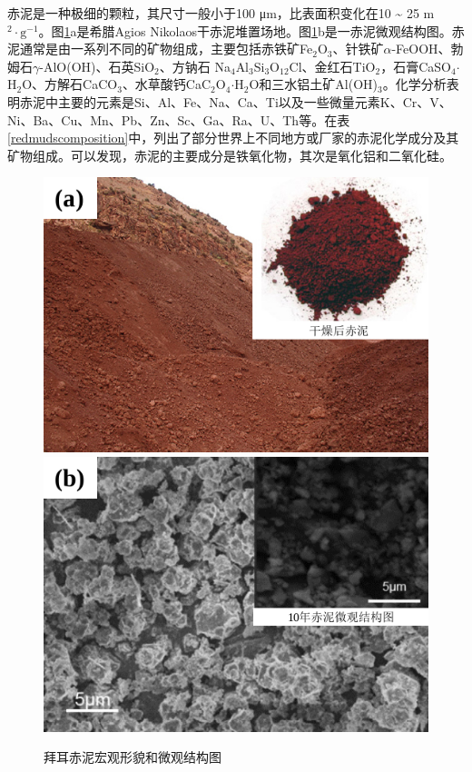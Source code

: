 赤泥是一种极细的颗粒，其尺寸一般小于100 μm，比表面积变化在10 \textasciitilde{ }25 m$ \mathrm{^{\mathrm{2}} \cdot g^{\mathrm{-1}}} $\cite{wang2008novel}。图\ref{redmudmicro}a是希腊Agios Nikolaos干赤泥堆置场地\cite{eurare2014}。图\ref{redmudmicro}b是一赤泥微观结构图\cite{zhong2009extraction,liu2007characterization}。赤泥通常是由一系列不同的矿物组成，主要包括赤铁矿Fe$ _{\mathrm{2}} $O$ _{\mathrm{3}} $、针铁矿$ \alpha $-FeOOH、勃姆石$ \gamma $-AlO(OH)、石英SiO$ _{\mathrm{2}} $、方钠石 Na$ _{\mathrm{4}} $Al$ _{\mathrm{3}} $\-Si$ _{\mathrm{3}} $O$ _{\mathrm{12}} $Cl、金红石TiO$ _{\mathrm{2}} $，石膏CaSO$ _{\mathrm{4}} $$ \cdot $H$ _{\mathrm{2}} $O、方解石CaCO$ _{\mathrm{3}} $、水草酸钙CaC$ _{\mathrm{2}} $O$ _{\mathrm{4}} $$ \cdot  $H$ _{\mathrm{2}} $O和三水铝土矿Al(OH)$ _{\mathrm{3}} $。化学分析表明赤泥中主要的元素是Si、Al、Fe、Na、Ca、Ti以及一些微量元素K、Cr、V、Ni、Ba、Cu、Mn、Pb、Zn、Sc、Ga、Ra、U、Th等。在表\ref{redmudscomposition}中，列出了部分世界上不同地方或厂家的赤泥化学成分及其矿物组成\cite{snars2009evaluation,newson2006effect,grafe2011bauxite,paramguru2004trends}。可以发现，赤泥的主要成分是铁氧化物，其次是氧化铝和二氧化硅。
\begin{figure}[!htbp]
	\centering
	\vspace{10pt}
	\includegraphics[width=0.45\linewidth]{Figures/c1/Figure3a}\hspace{4pt}\includegraphics[width=0.45\linewidth]{Figures/c1/Figure3b}
	\caption{拜耳赤泥宏观形貌和微观结构图}\label{redmudmicro}
\end{figure}

